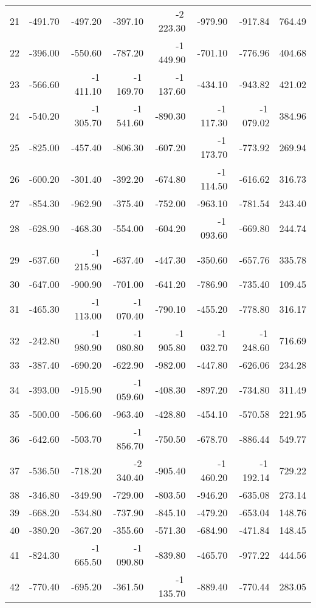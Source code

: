 \begin{longtable}{rrrrrrrr}
21 & -491.70 & -497.20 & -397.10 & -2\,223.30 & -979.90 & -917.84 & 764.49  \\
22 & -396.00 & -550.60 & -787.20 & -1\,449.90 & -701.10 & -776.96 & 404.68  \\
23 & -566.60 & -1\,411.10 & -1\,169.70 & -1\,137.60 & -434.10 & -943.82 & 421.02  \\
24 & -540.20 & -1\,305.70 & -1\,541.60 & -890.30 & -1\,117.30 & -1\,079.02 & 384.96  \\
25 & -825.00 & -457.40 & -806.30 & -607.20 & -1\,173.70 & -773.92 & 269.94  \\
26 & -600.20 & -301.40 & -392.20 & -674.80 & -1\,114.50 & -616.62 & 316.73  \\
27 & -854.30 & -962.90 & -375.40 & -752.00 & -963.10 & -781.54 & 243.40  \\
28 & -628.90 & -468.30 & -554.00 & -604.20 & -1\,093.60 & -669.80 & 244.74  \\
29 & -637.60 & -1\,215.90 & -637.40 & -447.30 & -350.60 & -657.76 & 335.78  \\
30 & -647.00 & -900.90 & -701.00 & -641.20 & -786.90 & -735.40 & 109.45  \\
31 & -465.30 & -1\,113.00 & -1\,070.40 & -790.10 & -455.20 & -778.80 & 316.17  \\
32 & -242.80 & -1\,980.90 & -1\,080.80 & -1\,905.80 & -1\,032.70 & -1\,248.60 & 716.69  \\
33 & -387.40 & -690.20 & -622.90 & -982.00 & -447.80 & -626.06 & 234.28  \\
34 & -393.00 & -915.90 & -1\,059.60 & -408.30 & -897.20 & -734.80 & 311.49  \\
35 & -500.00 & -506.60 & -963.40 & -428.80 & -454.10 & -570.58 & 221.95  \\
36 & -642.60 & -503.70 & -1\,856.70 & -750.50 & -678.70 & -886.44 & 549.77  \\
37 & -536.50 & -718.20 & -2\,340.40 & -905.40 & -1\,460.20 & -1\,192.14 & 729.22  \\
38 & -346.80 & -349.90 & -729.00 & -803.50 & -946.20 & -635.08 & 273.14  \\
39 & -668.20 & -534.80 & -737.90 & -845.10 & -479.20 & -653.04 & 148.76  \\
40 & -380.20 & -367.20 & -355.60 & -571.30 & -684.90 & -471.84 & 148.45  \\
41 & -824.30 & -1\,665.50 & -1\,090.80 & -839.80 & -465.70 & -977.22 & 444.56  \\
42 & -770.40 & -695.20 & -361.50 & -1\,135.70 & -889.40 & -770.44 & 283.05  \\

\end{longtable}
